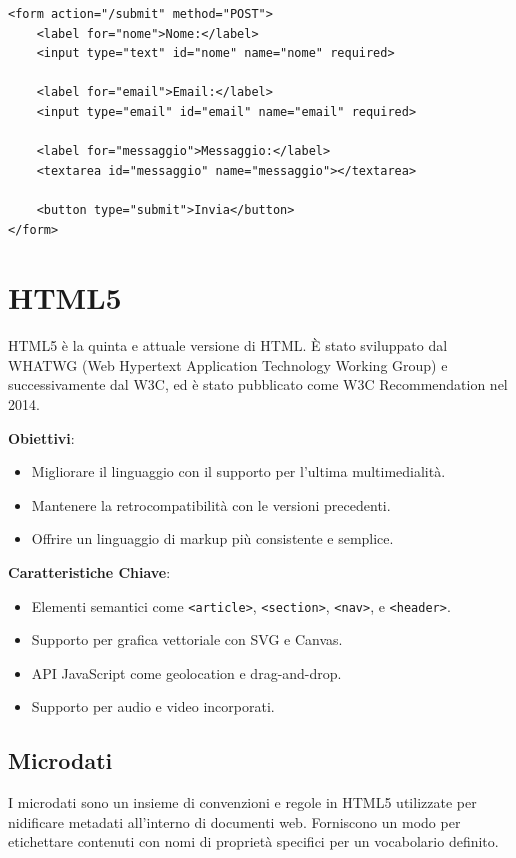\begin{lstlisting}[language=HTML5, caption=Esempio di form]
<form action="/submit" method="POST">
    <label for="nome">Nome:</label>
    <input type="text" id="nome" name="nome" required>

    <label for="email">Email:</label>
    <input type="email" id="email" name="email" required>

    <label for="messaggio">Messaggio:</label>
    <textarea id="messaggio" name="messaggio"></textarea>

    <button type="submit">Invia</button>
</form>
\end{lstlisting}

\section{HTML5}

HTML5 è la quinta e attuale versione di HTML. È stato sviluppato dal WHATWG (Web Hypertext Application Technology Working Group) e successivamente dal W3C, ed è stato pubblicato come W3C Recommendation nel 2014.

\textbf{Obiettivi}:
\begin{itemize}
    \item Migliorare il linguaggio con il supporto per l'ultima multimedialità.
    \item Mantenere la retrocompatibilità con le versioni precedenti.
    \item Offrire un linguaggio di markup più consistente e semplice.
\end{itemize}

\textbf{Caratteristiche Chiave}:
\begin{itemize}
    \item Elementi semantici come \texttt{<article>}, \texttt{<section>}, \texttt{<nav>}, e \texttt{<header>}.
    \item Supporto per grafica vettoriale con SVG e Canvas.
    \item API JavaScript come geolocation e drag-and-drop.
    \item Supporto per audio e video incorporati.
\end{itemize}

\subsection{Microdati}

I microdati sono un insieme di convenzioni e regole in HTML5 utilizzate per nidificare metadati all'interno di documenti web. Forniscono un modo per etichettare contenuti con nomi di proprietà specifici per un vocabolario definito.

